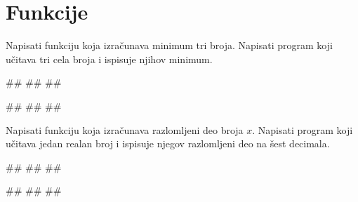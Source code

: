 \section{Funkcije}

\begin{Exercise}[label=FUN_01] 
Napisati funkciju  koja izračunava
minimum tri broja. Napisati program koji učitava tri cela broja i
ispisuje njihov minimum.

\begin{miditest}
\begin{upotreba}{1}
#\naslovInt#
##
##
\end{upotreba}
\end{miditest}
\begin{miditest}
\begin{upotreba}{2}
#\naslovInt#
##
##
\end{upotreba}
\end{miditest}
\end{Exercise}
\ifresenja 
\begin{Answer}[ref=FUN_01]
\end{Answer} 
\fi

\begin{Exercise}[label=FUN_02] 
Napisati funkciju  koja
izračunava razlomljeni deo broja $x$. Napisati program koji učitava
jedan realan broj i ispisuje njegov razlomljeni deo na šest decimala.
 
\begin{miditest}
\begin{upotreba}{1}
#\naslovInt#
##
##
\end{upotreba}
\end{miditest}
\begin{miditest}
\begin{upotreba}{2}
#\naslovInt#
##
##
\end{upotreba}
\end{miditest}
\end{Exercise}
\ifresenja 
\begin{Answer}[ref=FUN_02]
\end{Answer} 
\fi

